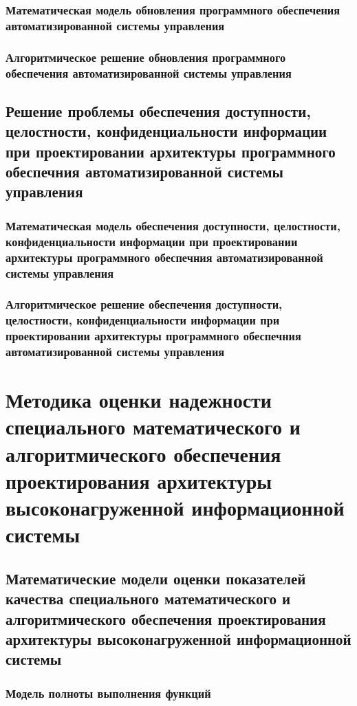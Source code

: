 \subsection{Математическая модель обновления программного обеспечения автоматизированной системы управления}\label{sec:ch2/sec6/sub1}
\subsection{Алгоритмическое решение обновления программного обеспечения автоматизированной системы управления}\label{sec:ch2/sec6/sub2}
\section{Решение проблемы обеспечения доступности, целостности, конфиденциальности информации при проектировании архитектуры программного обеспечния автоматизированной системы управления}\label{sec:ch2/sec7}
\subsection{Математическая модель обеспечения доступности, целостности, конфиденциальности информации при проектировании архитектуры программного обеспечния автоматизированной системы управления}\label{sec:ch2/sec7/sub1}
\subsection{Алгоритмическое решение обеспечения доступности, целостности, конфиденциальности информации при проектировании архитектуры программного обеспечния автоматизированной системы управления}\label{sec:ch2/sec7/sub2}
\chapter{Методика оценки надежности специального математического и алгоритмического обеспечения проектирования архитектуры высоконагруженной информационной системы}\label{ch:ch5}

\section{Математические модели оценки показателей качества специального математического и алгоритмического обеспечения проектирования архитектуры высоконагруженной информационной системы}\label{sec:ch3/sect1}
\subsection{Модель полноты выполнения функций}\label{subsec:ch3/sect2/sub1}
